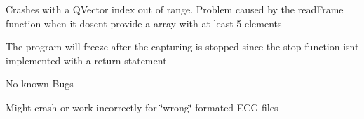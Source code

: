 
\begin{DoxyRefList}
\item[\label{bug__bug000003}%
\hypertarget{bug__bug000003}{}%
Class \hyperlink{classEcgCapture}{Ecg\+Capture} ]Crashes with a Q\+Vector index out of range. Problem caused by the read\+Frame function when it dosent provide a array with at least 5 elements  
\item[\label{bug__bug000006}%
\hypertarget{bug__bug000006}{}%
Member \hyperlink{classEcgCaptureMenu_a610d2985e09cd56cb381e6e443dbbc72}{Ecg\+Capture\+Menu\+:\+:new\+Menu} ()]The program will freeze after the capturing is stopped since the stop function isn\textquotesingle{}t implemented with a return statement  
\item[\label{bug__bug000004}%
\hypertarget{bug__bug000004}{}%
Class \hyperlink{classEcgMock}{Ecg\+Mock} ]No known Bugs  
\item[\label{bug__bug000005}%
\hypertarget{bug__bug000005}{}%
Class \hyperlink{classHrvWidget}{Hrv\+Widget} ]Might crash or work incorrectly for \char`\"{}wrong\char`\"{} formated E\+C\+G-\/files
\end{DoxyRefList}